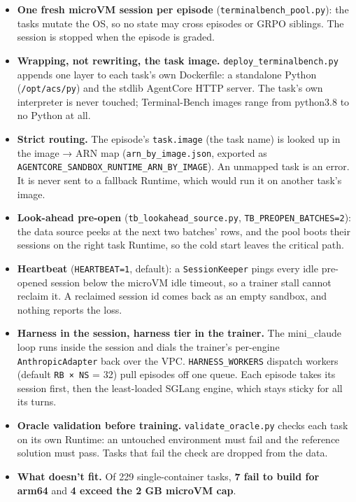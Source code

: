 \documentclass[
  paper=a4,
  ,captions=tableheading
]{scrartcl}
\providecommand{\tightlist}{%
  \setlength{\itemsep}{0pt}\setlength{\parskip}{0pt}}
\begin{document}
\begin{itemize}
\tightlist
\item
  \textbf{One fresh microVM session per episode}
  (\texttt{terminalbench\_pool.py}): the tasks mutate the OS, so no
  state may cross episodes or GRPO siblings. The session is stopped when
  the episode is graded.
\item
  \textbf{Wrapping, not rewriting, the task image.}
  \texttt{deploy\_terminalbench.py} appends one layer to each task's own
  Dockerfile: a standalone Python (\texttt{/opt/acs/py}) and the stdlib
  AgentCore HTTP server. The task's own interpreter is never touched;
  Terminal-Bench images range from python3.8 to no Python at all.
\item
  \textbf{Strict routing.} The episode's \texttt{task.image} (the task
  name) is looked up in the image → ARN map
  (\texttt{arn\_by\_image.json}, exported as
  \texttt{AGENTCORE\_SANDBOX\_RUNTIME\_ARN\_BY\_IMAGE}). An unmapped
  task is an error. It is never sent to a fallback Runtime, which would
  run it on another task's image.
\item
  \textbf{Look-ahead pre-open} (\texttt{tb\_lookahead\_source.py},
  \texttt{TB\_PREOPEN\_BATCHES=2}): the data source peeks at the next
  two batches' rows, and the pool boots their sessions on the right task
  Runtime, so the cold start leaves the critical path.
\item
  \textbf{Heartbeat} (\texttt{HEARTBEAT=1}, default): a
  \texttt{SessionKeeper} pings every idle pre-opened session below the
  microVM idle timeout, so a trainer stall cannot reclaim it. A
  reclaimed session id comes back as an empty sandbox, and nothing
  reports the loss.
\item
  \textbf{Harness in the session, harness tier in the trainer.} The
  mini\_claude loop runs inside the session and dials the trainer's
  per-engine \texttt{AnthropicAdapter} back over the VPC.
  \texttt{HARNESS\_WORKERS} dispatch workers (default \texttt{RB\ ×\ NS}
  = 32) pull episodes off one queue. Each episode takes its session
  first, then the least-loaded SGLang engine, which stays sticky for all
  its turns.
\item
  \textbf{Oracle validation before training.}
  \texttt{validate\_oracle.py} checks each task on its own Runtime: an
  untouched environment must fail and the reference solution must pass.
  Tasks that fail the check are dropped from the data.
\item
  \textbf{What doesn't fit.} Of 229 single-container tasks, \textbf{7
  fail to build for arm64} and \textbf{4 exceed the 2 GB microVM cap}.

\end{itemize}
\end{document}
